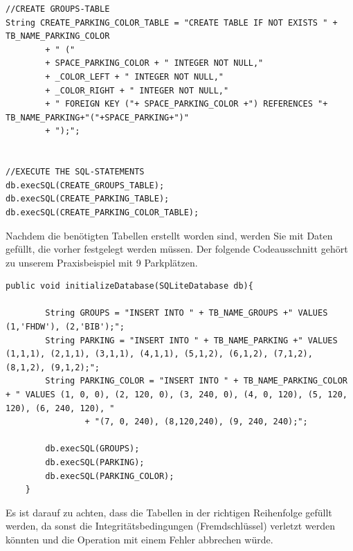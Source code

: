 \documentclass[11pt]{article}
\begin{document}
\begin{onehalfspacing}
\begin{lstlisting}
//CREATE GROUPS-TABLE
String CREATE_PARKING_COLOR_TABLE = "CREATE TABLE IF NOT EXISTS " + TB_NAME_PARKING_COLOR
		+ " (" 
		+ SPACE_PARKING_COLOR + " INTEGER NOT NULL,"
		+ _COLOR_LEFT + " INTEGER NOT NULL,"
		+ _COLOR_RIGHT + " INTEGER NOT NULL,"
		+ " FOREIGN KEY ("+ SPACE_PARKING_COLOR +") REFERENCES "+ TB_NAME_PARKING+"("+SPACE_PARKING+")"
		+ ");";


//EXECUTE THE SQL-STATEMENTS
db.execSQL(CREATE_GROUPS_TABLE);
db.execSQL(CREATE_PARKING_TABLE);
db.execSQL(CREATE_PARKING_COLOR_TABLE);	
\end{lstlisting}

Nachdem die benötigten Tabellen erstellt worden sind, werden Sie mit Daten
gefüllt, die vorher festgelegt werden müssen. Der folgende Codeausschnitt gehört
zu unserem Praxisbeispiel mit 9 Parkplätzen.
\begin{lstlisting}
public void initializeDatabase(SQLiteDatabase db){
		
		String GROUPS = "INSERT INTO " + TB_NAME_GROUPS +" VALUES (1,'FHDW'), (2,'BIB');";
		String PARKING = "INSERT INTO " + TB_NAME_PARKING +" VALUES (1,1,1), (2,1,1), (3,1,1), (4,1,1), (5,1,2), (6,1,2), (7,1,2), (8,1,2), (9,1,2);";
		String PARKING_COLOR = "INSERT INTO " + TB_NAME_PARKING_COLOR + " VALUES (1, 0, 0), (2, 120, 0), (3, 240, 0), (4, 0, 120), (5, 120, 120), (6, 240, 120), "
				+ "(7, 0, 240), (8,120,240), (9, 240, 240);";
	
		db.execSQL(GROUPS);
		db.execSQL(PARKING);
		db.execSQL(PARKING_COLOR);
	}
\end{lstlisting}
Es ist darauf zu achten, dass die Tabellen in der richtigen Reihenfolge gefüllt
werden, da sonst die Integritätsbedingungen (Fremdschlüssel) verletzt werden
könnten und die Operation mit einem Fehler abbrechen würde.

\end{onehalfspacing}
\end{document}
